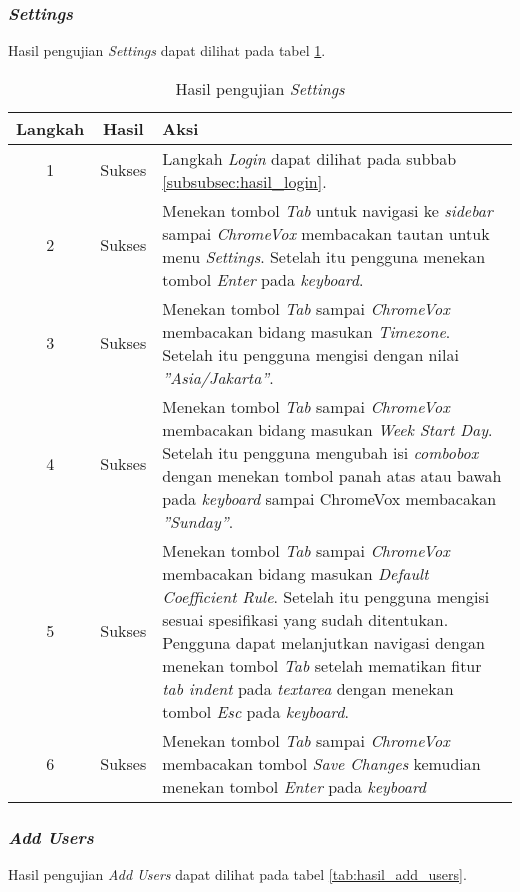 \subsubsection{\textit{Settings}}
\label{subsubsec:hasil_settings}
Hasil pengujian \textit{Settings} dapat dilihat pada tabel \ref{tab:hasil_settings}.

\begin{table}[H]
	\centering
	\caption{Hasil pengujian \textit{Settings}}
	\label{tab:hasil_settings}
	\begin{tabular}{|c|c|p{12cm}|}
		\toprule
		Langkah & Hasil & Aksi\\
		\midrule
		1 & Sukses & Langkah \textit{Login} dapat dilihat pada subbab \ref{subsubsec:hasil_login}.\\
		2 & Sukses & Menekan tombol \textit{Tab} untuk navigasi ke \textit{sidebar} sampai \textit{ChromeVox} membacakan tautan untuk menu \textit{Settings}. Setelah itu pengguna menekan tombol \textit{Enter} pada \textit{keyboard}.\\
		3 & Sukses & Menekan tombol \textit{Tab} sampai \textit{ChromeVox} membacakan bidang masukan \textit{Timezone}. Setelah itu pengguna mengisi dengan nilai \textit{''Asia/Jakarta''}.\\
		4 & Sukses & Menekan tombol \textit{Tab} sampai \textit{ChromeVox} membacakan bidang masukan \textit{Week Start Day}. Setelah itu pengguna mengubah isi \textit{combobox} dengan menekan tombol panah atas atau bawah pada \textit{keyboard} sampai ChromeVox membacakan \textit{''Sunday''}.\\
		5 & Sukses & Menekan tombol \textit{Tab} sampai \textit{ChromeVox} membacakan bidang masukan \textit{Default Coefficient Rule}. Setelah itu pengguna mengisi sesuai spesifikasi yang sudah ditentukan. Pengguna dapat melanjutkan navigasi dengan menekan tombol \textit{Tab} setelah mematikan fitur \textit{tab indent} pada \textit{textarea} dengan menekan tombol \textit{Esc} pada \textit{keyboard}.\\
		6 & Sukses & Menekan tombol \textit{Tab} sampai \textit{ChromeVox} membacakan tombol \textit{Save Changes} kemudian menekan tombol \textit{Enter} pada \textit{keyboard}\\
		\bottomrule
	\end{tabular}
\end{table}

\subsubsection{\textit{Add Users}}
\label{subsubsec:hasil_add_users}
Hasil pengujian \textit{Add Users} dapat dilihat pada tabel \ref{tab:hasil_add_users}.

